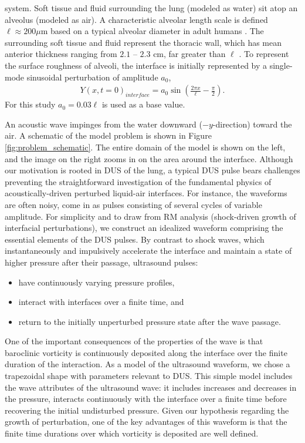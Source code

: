 \documentclass{jfm}%
\begin{document}
system. Soft tissue and fluid surrounding the lung (modeled as water)
sit atop an alveolus (modeled as air). A characteristic alveolar
length scale is defined $\ell \approx 200 \mu$m based on a typical
alveolar diameter in adult humans \citep{Ochs2004}. The surrounding
soft tissue and fluid represent the thoracic wall, which has mean
anterior thickness ranging from $2.1$ -- $2.3$ cm, far greater than
$\ell$ \citep{McLean2011}. To represent the surface roughness of
alveoli, the interface is initially represented by a single-mode
sinusoidal perturbation of amplitude $a_0$,
\begin{align}
  Y(x,t=0)_{interface} = a_0\sin\left(\frac{2\pi x}{\ell}-\frac{\pi}{2}\right).
\end{align}
For this study $a_0=0.03\ell$ is used as a base value.

An acoustic wave impinges from the water downward ($-y$-direction)
toward the air. A schematic of the model problem is shown in Figure
\ref{fig:problem_schematic}. The entire domain of the model is shown
on the left, and the image on the right zooms in on the area around
the interface.  Although our motivation is rooted in \ac{DUS} of the
lung, a typical \ac{DUS} pulse bears challenges preventing the
straightforward investigation of the fundamental physics of
acoustically-driven perturbed liquid-air interfaces. For instance, the
waveforms are often noisy, come in as pulses consisting of several
cycles of variable amplitude. For simplicity and to draw from RM
analysis (shock-driven growth of interfacial perturbations), we
construct an idealized waveform comprising the essential elements of
the \ac{DUS} pulses. By contrast to shock waves, which instantaneously
and impulsively accelerate the interface and maintain a state of
higher pressure after their passage, ultrasound pulses:
\begin{itemize}
\item have continuously varying pressure profiles, 
\item interact with interfaces over a finite time, and 
\item return to the initially unperturbed pressure state after the wave passage.
\end{itemize}

One of the important consequences of the properties of the wave is
that baroclinic vorticity is continuously deposited along the
interface over the finite duration of the interaction. As a model of
the ultrasound waveform, we chose a trapezoidal shape with parameters
relevant to \ac{DUS}. This simple model includes the wave attributes
of the ultrasound wave: it includes increases and decreases in the
pressure, interacts continuously with the interface over a finite time
before recovering the initial undisturbed pressure. Given our
hypothesis regarding the growth of perturbation, one of the key
advantages of this waveform is that the finite time durations over
which vorticity is deposited are well defined.
\end{document}
